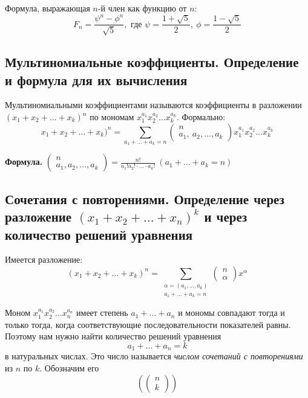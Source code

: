 \documentclass[a4paper]{article}
\begin{document}
\label{sec:1.38} Формула, выражающая $n$-й член как функцию от $n$: 
\begin{equation*}
    F_n=\frac{\psi^n-\phi^n}{\sqrt{5}},\text{ где }\psi=\frac{1+\sqrt{5}}{2},\ \phi=\frac{1-\sqrt{5}}{2}
\end{equation*}

\subsection{Мультиномиальные коэффициенты. Определение и формула для их вычисления}
 Мультиномиальными коэффициентами называются коэффициенты в разложении $(x_1+x_2+\ldots+x_k)^n$ по мономам $x_1^{a_1}x_2^{a_2}\ldots x_k^{a_k}$. Формально:
\begin{equation*}
    x_1+x_2+\ldots+x_k)^n=\sum\limits_{a_1+\ldots+a_k=n} \begin{pmatrix}
        n\\
        a_1,\ a_2,\ldots, a_k
    \end{pmatrix}x_1^{a_1}x_2^{a_2}\ldots x_k^{a_k}
\end{equation*}

\label{sec:1.39}\textbf{Формула.} $\begin{pmatrix}
    n\\
    a_1,a_2,\ldots,a_k
\end{pmatrix}=\displaystyle\frac{n!}{a_1!a_2!\cdot\ldots\cdot a_k!}\ (a_1+\ldots+a_k=n)$
\subsection{Сочетания с повторениями. Определение через разложение $(x_1+x_2+\ldots+x_n)^k$ и через количество решений уравнения}
Имеется разложение: $$
\left(x_{1}+x_{2}+\ldots+x_{k}\right)^{n}=\sum_{\substack{\alpha=\left(a_{1}, \ldots, a_{k}\right) \\
a_{1}+\ldots+a_{k}=n}}\left(\begin{array}{l}
n \\
\alpha
\end{array}\right) x^{\alpha}
$$

Моном $x_{1}^{a_{1}} x_{2}^{a_{2}} \ldots x_{n}^{a_{n}}$ имеет степень $a_{1}+\ldots+a_{n}$ и мономы совпадают тогда и только тогда, когда соответствующие последовательности показателей равны. Поэтому нам нужно найти количество решений уравнения
$$
a_{1}+\ldots+a_{n}=k
$$
в натуральных числах. Это число  называется \textit{числом сочетаний с повторениями} из $n$ по $k$. Обозначим его
$$
\left(\left(\begin{array}{l}
n \\
k
\end{array}\right)\right)
$$
\end{document}
